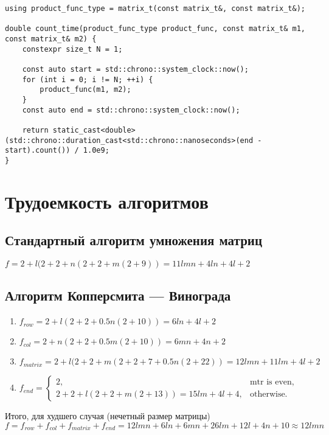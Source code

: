 \begin{lstlisting}[caption={Функция замера времени работы алгоритмов},label={lst:count_time},style={cpp}]
using product_func_type = matrix_t(const matrix_t&, const matrix_t&);

double count_time(product_func_type product_func, const matrix_t& m1, const matrix_t& m2) {
	constexpr size_t N = 1;

	const auto start = std::chrono::system_clock::now();
	for (int i = 0; i != N; ++i) {
		product_func(m1, m2);
	}
	const auto end = std::chrono::system_clock::now();

	return static_cast<double>(std::chrono::duration_cast<std::chrono::nanoseconds>(end - start).count()) / 1.0e9;
}
\end{lstlisting}

\section{Трудоемкость алгоритмов}

\subsection{Стандартный алгоритм умножения матриц}

$f = 2 + l(2 + 2 + n(2 + 2 + m(2 + 9)) = 11lmn + 4ln + 4l + 2$

\subsection{Алгоритм Копперсмита — Винограда}
\begin{enumerate}
	\item $f_{row} = 2 + l(2 + 2 + 0.5n(2 + 10)) = 6ln + 4l + 2$
	\item $f_{col} = 2 + n(2 + 2 + 0.5m(2 + 10)) = 6mn + 4n + 2$
	\item $f_{matrix} = 2 + l(2 + 2 + m(2 + 2 + 7 + 0.5n(2 + 22)) = 12lmn + 11lm + 4l + 2$
	\item $f_{end} = \begin{cases}
	2, & \text{mtr is even,}\\
	2 + 2 + l(2 + 2 + m(2 + 13)) = 15lm + 4l + 4, & \text{otherwise.}
	\end{cases}$
\end{enumerate}

Итого, для худшего случая (нечетный размер матрицы) $f = f_{row} + f_{col} + f_{matrix} + f_{end} = 12lmn + 6ln + 6mn + 26lm + 12l + 4n + 10 \approx 12lmn$

